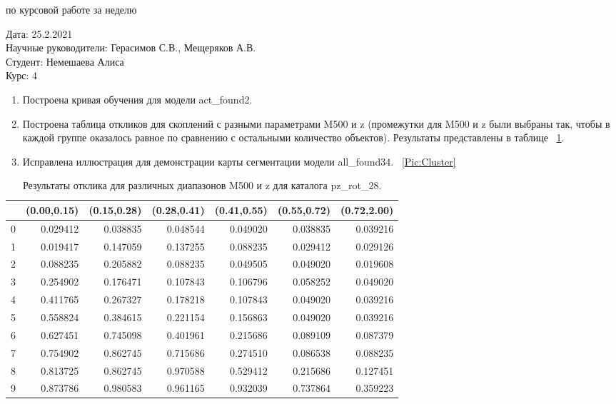 \documentclass{article}
\begin{document}
\begin{center}{ по курсовой работе за неделю\\}\end{center}
Дата: 25.2.2021\\
Научные руководители: Герасимов С.В., Мещеряков А.В.\\
Студент: Немешаева Алиса\\
Курс: 4\\

\renewcommand{\labelitemi}{$\blacksquare$}
\renewcommand\labelitemii{$\square$}
\begin{enumerate}
    \item Построена кривая обучения для модели act\_found2.\\
    \item Построена таблица откликов для скоплений с разными параметрами M500 и z (промежутки для 
        M500 и z были выбраны так, чтобы в каждой группе оказалось равное по сравнению с остальными
        количество объектов). Результаты представлены в таблице ~\ref{Tab:Tcr}{}.\\
    \item Исправлена иллюстрация для демонстрации карты сегментации модели all\_found34. 
        ~\ref{Pic:Cluster}{}\\
\end{enumerate}



\begin{table}
\begin{tabular}{lrrrrrr}
\toprule
{} &  (0.00,0.15) &  (0.15,0.28) &  (0.28,0.41) &  (0.41,0.55) &  (0.55,0.72) &  (0.72,2.00) \\
\midrule
0 &     0.029412 &     0.038835 &     0.048544 &     0.049020 &     0.038835 &     0.039216 \\
1 &     0.019417 &     0.147059 &     0.137255 &     0.088235 &     0.029412 &     0.029126 \\
2 &     0.088235 &     0.205882 &     0.088235 &     0.049505 &     0.049020 &     0.019608 \\
3 &     0.254902 &     0.176471 &     0.107843 &     0.106796 &     0.058252 &     0.049020 \\
4 &     0.411765 &     0.267327 &     0.178218 &     0.107843 &     0.049020 &     0.039216 \\
5 &     0.558824 &     0.384615 &     0.221154 &     0.156863 &     0.049020 &     0.039216 \\
6 &     0.627451 &     0.745098 &     0.401961 &     0.215686 &     0.089109 &     0.087379 \\
7 &     0.754902 &     0.862745 &     0.715686 &     0.274510 &     0.086538 &     0.088235 \\
8 &     0.813725 &     0.862745 &     0.970588 &     0.529412 &     0.215686 &     0.127451 \\
9 &     0.873786 &     0.980583 &     0.961165 &     0.932039 &     0.737864 &     0.359223 \\
\bottomrule
\end{tabular}
\caption{Результаты отклика для различных диапазонов M500 и z для каталога pz\_rot\_28.}
\label{Tab:Tcr}
\end{table}
\end{document}
